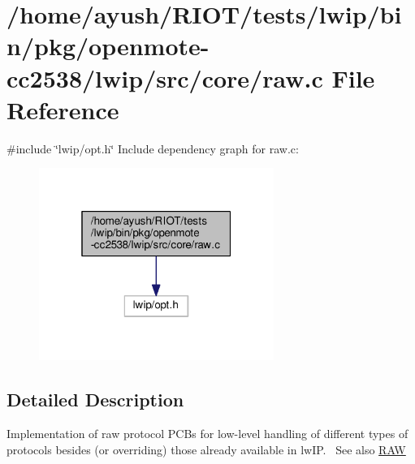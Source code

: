 \hypertarget{openmote-cc2538_2lwip_2src_2core_2raw_8c}{}\section{/home/ayush/\+R\+I\+O\+T/tests/lwip/bin/pkg/openmote-\/cc2538/lwip/src/core/raw.c File Reference}
\label{openmote-cc2538_2lwip_2src_2core_2raw_8c}
{\ttfamily \#include \char`\"{}lwip/opt.\+h\char`\"{}}\newline
Include dependency graph for raw.\+c\+:
\nopagebreak
\begin{figure}[H]
\begin{center}
\leavevmode
\includegraphics[width=217pt]{openmote-cc2538_2lwip_2src_2core_2raw_8c__incl}
\end{center}
\end{figure}


\subsection{Detailed Description}
Implementation of raw protocol P\+C\+Bs for low-\/level handling of different types of protocols besides (or overriding) those already available in lw\+IP.~\newline
See also \hyperlink{group__raw__raw}{R\+AW} 